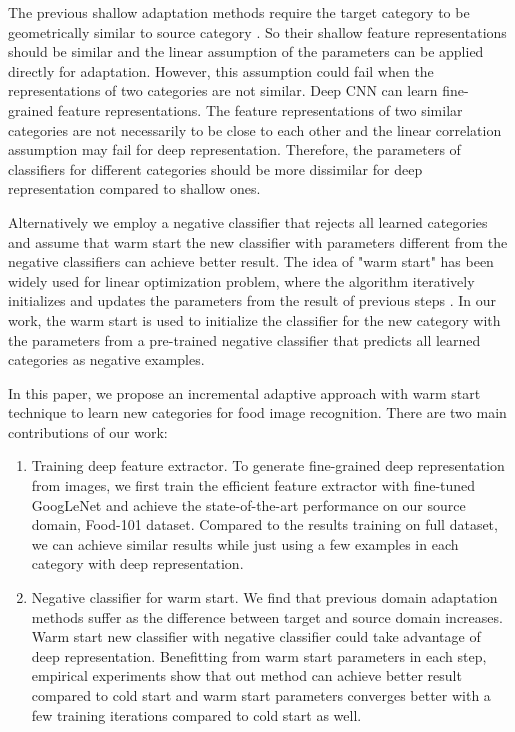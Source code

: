 The previous shallow adaptation methods require the target category to be geometrically similar to source category \cite{aytar2011tabula}. So their shallow feature representations should be similar and the linear assumption of the parameters can be applied directly for adaptation. However, this assumption could fail when the representations of two categories are not similar.
Deep CNN can learn fine-grained feature representations. The feature representations of two similar categories are not necessarily to be close to each other and the linear correlation assumption may fail for deep representation. Therefore, the parameters of classifiers for different categories should be more dissimilar for deep representation compared to shallow ones. 

Alternatively we employ a negative classifier that rejects all learned categories and assume that warm start the new classifier with parameters different from the negative classifiers can achieve better result. The idea of "warm start" has been widely used for linear optimization problem, where the algorithm iteratively initializes and updates the parameters from the result of previous steps \cite{yildirim2002warm} \cite{john2008implementation} \cite{zeilinger2011real} \cite{chuwarm}. In our work, the warm start is used to initialize the classifier for the new category with the parameters from a pre-trained negative classifier that predicts all learned categories as negative examples.

 In this paper, we propose an incremental adaptive approach with warm start technique to learn new categories for food image recognition. There are two main contributions of our work:
\begin{enumerate}
  \item Training deep feature extractor. To generate fine-grained deep representation from images, we first train the efficient feature extractor with fine-tuned GoogLeNet and achieve the state-of-the-art performance on our source domain, Food-101 dataset. Compared to the results training on full dataset, we can achieve similar results while just using a few examples in each category with deep representation.
  \item Negative classifier for warm start. We find that previous domain adaptation methods suffer as the difference between target and source domain increases. Warm start new classifier with negative classifier could take advantage of deep representation. Benefitting from warm start parameters in each step, empirical experiments show that out method can achieve better result compared to cold start and warm start parameters converges better with a few training iterations compared to cold start as well.
\end{enumerate}

